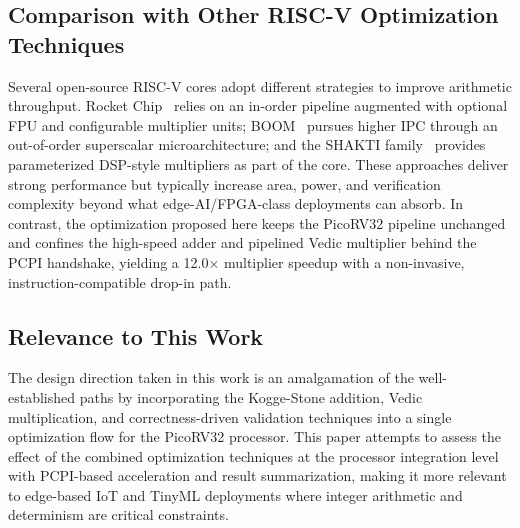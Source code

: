 \subsection{Comparison with Other RISC-V Optimization Techniques}
Several open-source RISC-V cores adopt different strategies to improve arithmetic throughput. Rocket Chip~\cite{asanovic2016rocket} relies on an in-order pipeline augmented with optional FPU and configurable multiplier units; BOOM~\cite{celio2017boom} pursues higher IPC through an out-of-order superscalar microarchitecture; and the SHAKTI family~\cite{gala2016shakti} provides parameterized DSP-style multipliers as part of the core. These approaches deliver strong performance but typically increase area, power, and verification complexity beyond what edge-AI/FPGA-class deployments can absorb. In contrast, the optimization proposed here keeps the PicoRV32 pipeline unchanged and confines the high-speed adder and pipelined Vedic multiplier behind the PCPI handshake, yielding a 12.0$\times$ multiplier speedup with a non-invasive, instruction-compatible drop-in path.

\subsection{Relevance to This Work}
The design direction taken in this work is an amalgamation of the well-established paths by incorporating the Kogge-Stone addition, Vedic multiplication, and correctness-driven validation techniques into a single optimization flow for the PicoRV32 processor. This paper attempts to assess the effect of the combined optimization techniques at the processor integration level with PCPI-based acceleration and result summarization, making it more relevant to edge-based IoT and TinyML deployments where integer arithmetic and determinism are critical constraints.
